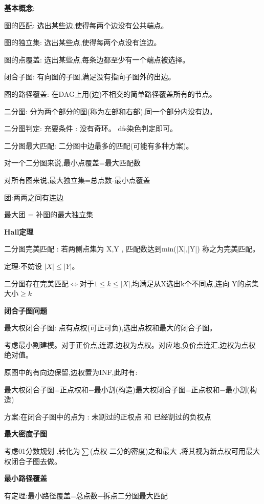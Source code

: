 \documentclass[a4paper,fontset=none]{ctexart}
\begin{document}
\textbf{基本概念}:

图的匹配: 选出某些边,使得每两个边没有公共端点。

图的独立集: 选出某些点,使得每两个点没有连边。

图的点覆盖: 选出某些点,每条边都至少有一个端点被选择。

闭合子图: 有向图的子图,满足没有指向子图外的出边。

图的路径覆盖: 在DAG上用(边)不相交的简单路径覆盖所有的节点。

二分图: 分为两个部分的图(称为左部和右部),同一个部分内没有边。

二分图判定: 充要条件 : 没有奇环。 dfs染色判定即可。

二分图最大匹配: 二分图中边最多的匹配(可能有多种方案)。

对一个二分图来说,最小点覆盖=最大匹配数

对所有图来说,最大独立集=总点数-最小点覆盖

团:两两之间有连边

最大团 = 补图的最大独立集




\textbf{Hall定理}



二分图完美匹配 : 若两侧点集为 X,Y , 匹配数达到min(|X|,|Y|) 称之为完美匹配。

定理:不妨设 $|X|\leqslant |Y|$。

二分图存在完美匹配$\iff$对于$1\leqslant k\leqslant |X|$,均满足从X选出k个不同点,连向 Y的点集大小$\geqslant k$



\textbf{闭合子图问题}

最大权闭合子图: 点有点权(可正可负),选出点权和最大的闭合子图。

考虑最小割建模。对于正价点,连源,边权为点权。对应地,负价点连汇,边权为点权绝对值。

原图中的有向边保留,边权置为INF,此时有:

最大权闭合子图=正点权和−最小割(构造)最大权闭合子图=正点权和−最小割(构造)

方案:在闭合子图中的点为 : 未割过的正权点 \quad 和 \quad 已经割过的负权点



\textbf{最大密度子图}

考虑01分数规划 ,转化为$\sum$(点权-二分的密度)之和最大 ,将其视为新点权可用最大权闭合子图去做。



\textbf{最小路径覆盖}

有定理:最小路径覆盖=总点数−拆点二分图最大匹配
\end{document}
